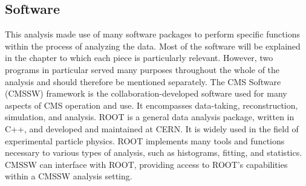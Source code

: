 \subsection{Software}
\label{over:software}



This analysis made use of many software packages 
to perform specific functions within 
the process of analyzing the data.  
Most of the software will be explained 
in the chapter to which each piece is particularly 
relevant.  
However, two programs in particular 
served many purposes 
throughout the whole of the analysis and 
should therefore be mentioned separately.  
%
The CMS Software (CMSSW) framework is 
the collaboration-developed software 
used for many aspects of CMS operation and use.  
It encompasses data-taking, reconstruction, 
simulation, and analysis.  
%
ROOT is a general data analysis package, 
written in C++, 
and developed and maintained at CERN. 
It is widely used in the field of 
experimental particle physics.  
ROOT implements many tools and functions 
necessary to various types of analysis, 
such as histograms, fitting, 
and statistics.  
CMSSW can interface with ROOT, 
providing access to ROOT's %
capabilities within a CMSSW 
analysis setting.  

